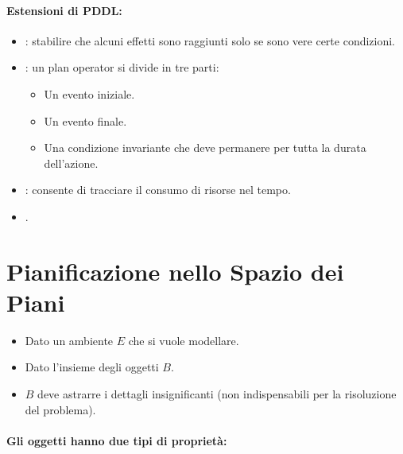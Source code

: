 
\paragraph{Estensioni di PDDL:}

\begin{itemize}
  \item {}: stabilire che alcuni effetti sono raggiunti solo se sono vere certe condizioni. 
  \item {}: un plan operator si divide in tre parti: 
    \begin{itemize}
      \item Un evento iniziale. 
      \item Un evento finale. 
      \item Una condizione invariante che deve permanere per tutta la durata dell'azione. 
    \end{itemize}
  \item {}: consente di tracciare il consumo di risorse nel tempo. 
  \item {}.
\end{itemize}

\section{Pianificazione nello Spazio dei Piani}


\begin{itemize}
  \item Dato un ambiente $E$ che si vuole modellare. 
  \item Dato l'insieme degli oggetti  $B$. 
  \item $B$ deve astrarre i dettagli insignificanti (non indispensabili per la risoluzione del problema).
\end{itemize}

\paragraph{Gli oggetti hanno due tipi di proprietà:}

